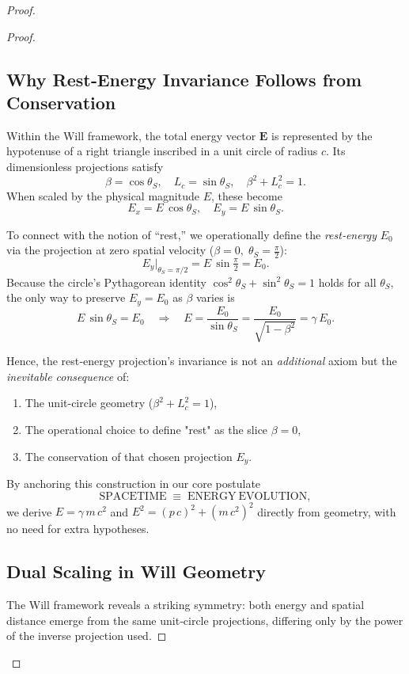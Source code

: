 \documentclass{article}
\begin{document}
\begin{proof}
\begin{proof}
\subsection{Why Rest‐Energy Invariance Follows from Conservation}

Within the Will framework, the total energy vector \(\mathbf{E}\) is represented by the hypotenuse of a right triangle inscribed in a unit circle of radius \(c\).  Its dimensionless projections satisfy
\[
  \beta = \cos\theta_S,\quad 
  L_c = \sin\theta_S,\quad 
  \beta^2 + L_c^2 = 1.
\]
When scaled by the physical magnitude \(E\), these become
\[
  E_x = E\,\cos\theta_S,\quad 
  E_y = E\,\sin\theta_S.
\]

To connect with the notion of “rest,” we operationally define the \emph{rest‐energy} \(E_0\) via the projection at zero spatial velocity (\(\beta=0,\;\theta_S=\tfrac\pi2\)):
\[
  E_y\bigl|_{\theta_S=\pi/2} 
  = E\,\sin\tfrac\pi2 
  = E_0.
\]
Because the circle’s Pythagorean identity \(\cos^2\theta_S + \sin^2\theta_S = 1\) holds for all \(\theta_S\), the only way to preserve \(E_y = E_0\) as \(\beta\) varies is
\[
  E\,\sin\theta_S = E_0 
  \quad\Longrightarrow\quad
  E = \frac{E_0}{\sin\theta_S}
    = \frac{E_0}{\sqrt{1-\beta^2}}
    = \gamma\,E_0.
\]

Hence, the rest‐energy projection's invariance is not an \emph{additional} axiom but the \emph{inevitable consequence} of:

\begin{enumerate}
\item The unit-circle geometry (\(\beta^2 + L_c^2 = 1\)),  
\item The operational choice to define "rest" as the slice \(\beta=0\),  
\item The conservation of that chosen projection \(E_y\).
\end{enumerate}

By anchoring this construction in our core postulate
\[
  \mathrm{SPACETIME} \;\equiv\; \mathrm{ENERGY\ EVOLUTION},
\]
we derive \(E = \gamma\,m\,c^2\) and \(E^2 = (p\,c)^2 + (m\,c^2)^2\) directly from geometry, with no need for extra hypotheses.


\subsection{Dual Scaling in Will Geometry}

The Will framework reveals a striking symmetry: both energy and spatial distance emerge from the same unit‐circle projections, differing only by the power of the inverse projection used.


\end{proof}
\end{proof}
\end{document}

